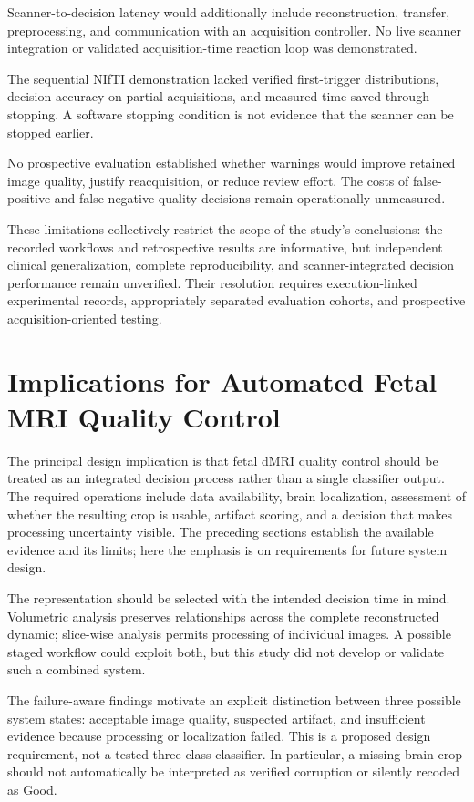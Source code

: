Scanner-to-decision latency would additionally include reconstruction, transfer, preprocessing, and communication with an acquisition controller. No live scanner integration or validated acquisition-time reaction loop was demonstrated.

The sequential NIfTI demonstration lacked verified first-trigger distributions, decision accuracy on partial acquisitions, and measured time saved through stopping. A software stopping condition is not evidence that the scanner can be stopped earlier.

No prospective evaluation established whether warnings would improve retained image quality, justify reacquisition, or reduce review effort. The costs of false-positive and false-negative quality decisions remain operationally unmeasured.

These limitations collectively restrict the scope of the study's conclusions: the recorded workflows and retrospective results are informative, but independent clinical generalization, complete reproducibility, and scanner-integrated decision performance remain unverified. Their resolution requires execution-linked experimental records, appropriately separated evaluation cohorts, and prospective acquisition-oriented testing.

\section{Implications for Automated Fetal MRI Quality Control}
\label{sec:discussion_implications}

The principal design implication is that fetal dMRI quality control should be treated as an integrated decision process rather than a single classifier output. The required operations include data availability, brain localization, assessment of whether the resulting crop is usable, artifact scoring, and a decision that makes processing uncertainty visible. The preceding sections establish the available evidence and its limits; here the emphasis is on requirements for future system design.

The representation should be selected with the intended decision time in mind. Volumetric analysis preserves relationships across the complete reconstructed dynamic; slice-wise analysis permits processing of individual images. A possible staged workflow could exploit both, but this study did not develop or validate such a combined system.

The failure-aware findings motivate an explicit distinction between three possible system states: acceptable image quality, suspected artifact, and insufficient evidence because processing or localization failed. This is a proposed design requirement, not a tested three-class classifier. In particular, a missing brain crop should not automatically be interpreted as verified corruption or silently recoded as Good.

